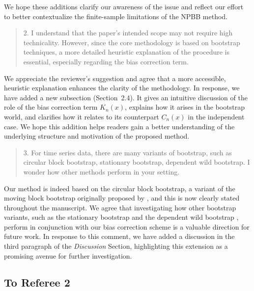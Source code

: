 \documentclass[12pt]{article}
\newenvironment{comment}%
{\begin{quotation}\noindent\small\it\color{darkblue}\ignorespaces%
}{\end{quotation}}
\begin{document}
We hope these additions clarify our awareness of the issue and reflect 
our effort to better contextualize the finite-sample limitations of the 
NPBB method.


\begin{comment}
2. I understand that the paper’s intended scope may not require high 
technicality. However,
since the core methodology is based on bootstrap techniques, a more detailed 
heuristic
explanation of the procedure is essential, especially regarding the bias 
correction term.
\end{comment}


We appreciate the reviewer’s suggestion and agree that a more accessible, 
heuristic explanation enhances the clarity of the methodology. In response, 
we have added a new subsection (Section~2.4). It gives an intuitive
discussion of the role of the bias correction term $ K_n(x)$, explains
how it arises in the bootstrap world, and clarifies how it relates to
its counterpart $C_n(x)$ in the independent case. We hope this
addition helps readers gain a better understanding of the underlying
structure and motivation of the proposed method.


\begin{comment}
3. For time series data, there are many variants of bootstrap, such as circular 
block bootstrap,
stationary bootstrap, dependent wild bootstrap. I wonder how other methods 
perform in
your setting.
\end{comment} 

Our method is indeed based on the circular block bootstrap, a variant
of the moving block bootstrap originally proposed by
\citet{romano1992circular}, and this is now clearly stated throughout
the manuscript. We agree that investigating how other bootstrap
variants, such as the stationary bootstrap
\citep{politis1994stationary} and the dependent wild
bootstrap \citep{shao2010dependent}, perform in conjunction with our
bias correction scheme is a valuable direction for future work. In
response to this comment, we have added a discussion in the third
paragraph of the \emph{Discussion} Section, highlighting this
extension as a promising avenue for further investigation.


\subsection*{To Referee 2}
\end{document}
